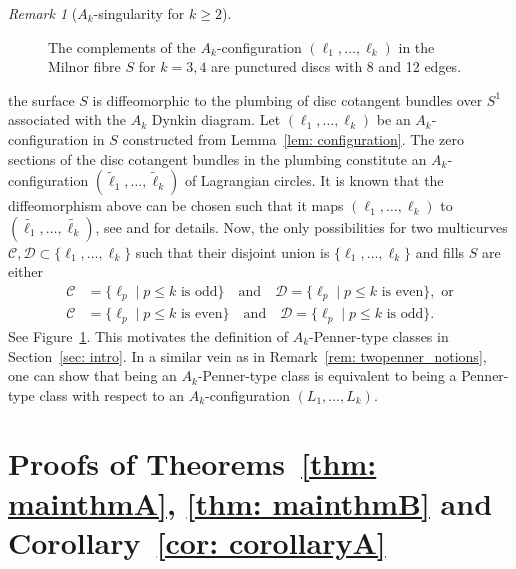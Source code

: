 \documentclass[12pt]{article}
\renewcommand{\le}{\leqslant}
\renewcommand{\ge}{\geqslant}
\theoremstyle{theorem}
\theoremstyle{definition}
\theoremstyle{remark}
\newtheorem{remark}[theorem]{Remark}
\numberwithin{equation}{section}
\DeclareMathOperator{\Symp}{Symp}
\DeclareMathOperator{\st}{st}
\begin{document}
\begin{remark}[$A_k$-singularity for $k\ge 2$]
\begin{figure}[t]
    \caption{The complements of the $A_k$-configuration $(\ell_1,\dots,\ell_k)$ in the Milnor fibre $S$ for $k=3,4$ are punctured discs with 8 and 12 edges.
    }
    \label{fig: a3surface}
\end{figure}
the surface $S$ is diffeomorphic to the plumbing of disc cotangent bundles over $S^1$ associated with the $A_k$ Dynkin diagram.
Let $(\ell_1,\dots,\ell_k)$ be an $A_k$-configuration in $S$ constructed from Lemma~\ref{lem: configuration}.
The zero sections of the disc cotangent bundles in the plumbing constitute an $A_k$-configuration $(\tilde{\ell}_1,\dots,\tilde{\ell}_k)$ of Lagrangian circles.
It is known that the diffeomorphism above can be chosen such that it maps $(\ell_1,\dots,\ell_k)$ to $(\tilde{\ell_1},\dots,\tilde{\ell_k})$, see \cite[Section~3.3.2]{BaKw21} and \cite[Section~1]{Wu14} for details.
Now, the only possibilities for two multicurves $\mathcal{C},\mathcal{D}\subset \{\ell_1,\dots,\ell_k\}$ such that their disjoint union is $\{\ell_1,\dots,\ell_k\}$ and fills $S$ are either
\begin{align*}
\mathcal{C} &= \{\ell_{p}\mid p\le k\text{ is odd}\}\quad \text{and}\quad \mathcal{D}=\{\ell_{p}\mid p\le k\text{ is even}\}, \text{ or}\\
\mathcal{C} &= \{\ell_{p}\mid p\le k\text{ is even}\}\quad\text{and}\quad\mathcal{D}=\{\ell_{p}\mid p\le k\text{ is odd}\}.
\end{align*}
See Figure~\ref{fig: a3surface}.
This motivates the definition of $A_k$-Penner-type classes in Section~\ref{sec: intro}.
In a similar vein as in Remark~\ref{rem: twopenner_notions}, one can show that being an $A_k$-Penner-type class is equivalent to being a Penner-type class with respect to an $A_k$-configuration $(L_1,\dots,L_k)$.
\end{remark}


\section{Proofs of Theorems~\ref{thm: mainthmA}, \ref{thm: mainthmB} and Corollary~\ref{cor: corollaryA}}\label{sec: proofs}
\end{document}
